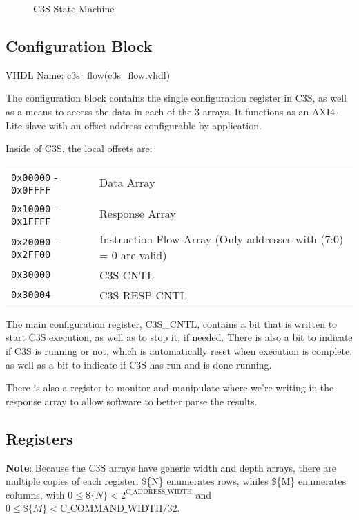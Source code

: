 \begin{figure}[h]
  \begin{center}
    
  \end{center}
  \caption[C3S State Machine]{\label{fig:c3s_fsm}C3S State Machine
  }
\end{figure}

\subsection{Configuration Block}
VHDL Name: c3s\_flow(c3s\_flow.vhdl)

The configuration block contains the single configuration register in
C3S, as well as a means to access the data in each of the 3 arrays. It
functions as an AXI4-Lite slave with an offset address configurable by
application.

Inside of C3S, the local offsets are:

\begin{center}
  \begin{tabular}{l|l}
    \texttt{0x00000} - \texttt{0x0FFFF} & Data Array \\
    \texttt{0x10000} - \texttt{0x1FFFF} & Response Array \\
    \texttt{0x20000} - \texttt{0x2FF00} & Instruction Flow Array (Only addresses with (7:0) = 0 are valid) \\
    \texttt{0x30000}                    & C3S CNTL \\
    \texttt{0x30004}                    & C3S RESP CNTL \\
  \end{tabular}
\end{center}

The main configuration register, C3S\_CNTL, contains a bit that is
written to start C3S execution, as well as to stop it, if
needed. There is also a bit to indicate if C3S is running or not,
which is automatically reset when execution is complete, as well as a
bit to indicate if C3S has run and is done running.

There is also a register to monitor and manipulate where we're writing
in the response array to allow software to better parse the results.

\subsection{Registers}

\textbf{Note}: Because the C3S arrays have generic width and depth
arrays, there are multiple copies of each register. \$\{N\} enumerates
rows, whiles \$\{M\} enumerates columns, with $0 \leq \$\{N\} <
2^{\textrm{C\_ADDRESS\_WIDTH}}$ and $0 \leq \$\{M\} <
\textrm{C\_COMMAND\_WIDTH} / 32$.

